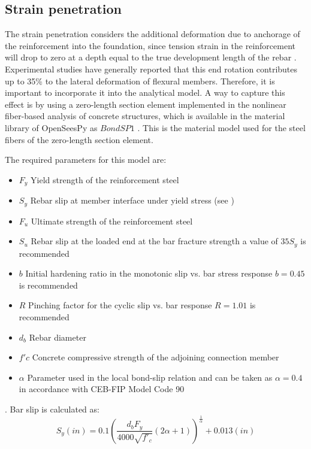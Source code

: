 \subsection{Strain penetration}

The strain penetration considers the additional deformation due to anchorage of the reinforcement into the foundation, since tension strain in the reinforcement will drop to zero at a depth equal to the true development length of the rebar \cite{Priestley2007}. Experimental studies have generally reported that this end rotation contributes up to 35\% to the lateral deformation of flexural members\cite{Zhao2007}. Therefore, it is important to incorporate it into the analytical model. A way to capture this effect is by using a zero-length section element implemented in the nonlinear fiber-based analysis of concrete structures, which is available in the material library of OpenSeesPy as $Bond SP1$ \cite{Zhao2007}. This is the material model used for the steel fibers of the zero-length section element.

The required parameters for this model are:
\begin{itemize}
	\item $F_{y}$ Yield strength of the reinforcement steel
	\item $S_{y}$ Rebar slip at member interface under yield stress (see )
	\item $F_{u}$ Ultimate strength of the reinforcement steel
	\item $S_{u}$ Rebar slip at the loaded end at the bar fracture strength a value of $35 S_{y}$ is recommended \cite{Zhao2007}
	\item $b$ Initial hardening ratio in the monotonic slip vs. bar stress response $b=0.45$ is recommended \cite{Zhao2007}
	\item $R$ Pinching factor for the cyclic slip vs. bar response $R=1.01$ is recommended \cite{Zhao2007}
	\item $d_b$ Rebar diameter
	\item $f'c$ Concrete compressive strength of the adjoining connection member
	\item $\alpha$ Parameter used in the local bond-slip relation and can be taken as $\alpha=0.4$ in accordance with CEB-FIP Model Code 90 \cite{CEB1993}
\end{itemize}.
\newline
Bar slip is calculated as:
\begin{equation}
	S_{y}(in)=0.1\left(\frac{d_{b}F_{y}}{4000\sqrt{f'_{c}}}\left(2\alpha+1\right)\right)^{\frac{1}{\alpha}}+0.013 (in)
	\label{eq.Rebar_Slip}
\end{equation}
